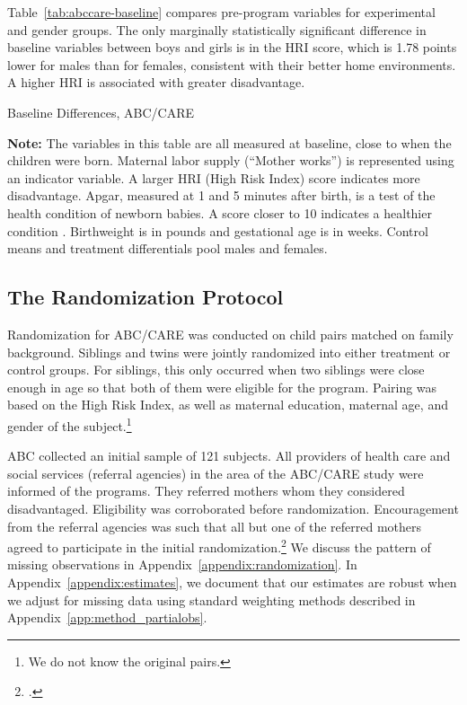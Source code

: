 Table~\ref{tab:abccare-baseline} compares pre-program variables for experimental and gender groups. The only marginally statistically significant difference in baseline variables between boys and girls is in the HRI score, which is 1.78 points lower for males than for females, consistent with their better home environments. A higher HRI is associated with greater disadvantage.

\begin{table}[!htbp]
\centering
\caption{Baseline Differences, ABC/CARE}
\label{tab:abccare-baseline}
\begin{threeparttable}
	
\begin{tablenotes}
\footnotesize
\item \textbf{Note:} The variables in this table are all measured at baseline, close to when the children were born. Maternal labor supply (``Mother works'') is represented using an indicator variable. A larger HRI (High Risk Index) score indicates more disadvantage. Apgar, measured at 1 and 5 minutes after birth, is a test of the health condition of newborn babies. A score closer to 10 indicates a healthier condition \citep{Apgar_1966_APGAR-Scoring_PCNA}. Birthweight is in pounds and gestational age is in weeks. Control means and treatment differentials pool males and females.
\end{tablenotes}
\end{threeparttable}
\end{table}

\subsection{The Randomization Protocol} \label{section:randomization}

Randomization for ABC/CARE was conducted on child pairs matched on family background. Siblings and twins were jointly randomized into either treatment or control groups. For siblings, this only occurred when two siblings were close enough in age so that both of them were eligible for the program. Pairing was based on the High Risk Index, as well as maternal education, maternal age, and gender of the subject.\footnote{We do not know the original pairs.}

ABC collected an initial sample of 121 subjects. All providers of health care and social services (referral agencies) in the area of the ABC/CARE study were informed of the programs. They referred mothers whom they considered disadvantaged. Eligibility was corroborated before randomization. Encouragement from the referral agencies was such that all but one of the referred mothers agreed to participate in the initial randomization.\footnote{\citet{Ramey_Yeates_Short_1984_CD,Campbell_Ramey_1995_AERJ}.}  We discuss the pattern of missing observations in Appendix~\ref{appendix:randomization}. In Appendix~\ref{appendix:estimates}, we document that our estimates are robust when we adjust for missing data using standard weighting methods described in Appendix~\ref{app:method_partialobs}.


